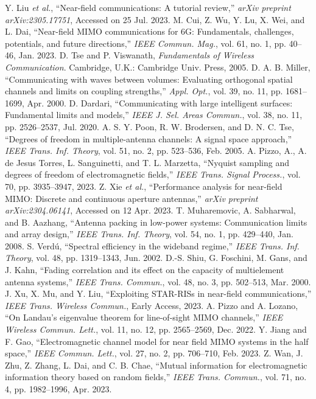 \documentclass[journal]{IEEEtran}
\theoremstyle{definition}
\begin{document}
\begin{thebibliography}{00}
 Y. Liu \emph{et al.}, ``Near-field communications: A tutorial review,'' \emph{arXiv preprint arXiv:2305.17751}, Accessed on 25 Jul. 2023.
 M. Cui, Z. Wu, Y. Lu, X. Wei, and L. Dai, ``Near-field MIMO communications for 6G: Fundamentals, challenges, potentials, and future directions,'' \emph{IEEE Commun. Mag.}, vol. 61, no. 1, pp. 40--46, Jan. 2023.
 D. Tse and P. Viswanath, \emph{Fundamentals of Wireless Communication}. Cambridge, U.K.: Cambridge Univ. Press, 2005.
 D. A. B. Miller, ``Communicating with waves between volumes: Evaluating orthogonal spatial channels and limits on coupling strengths,'' \emph{Appl. Opt.}, vol. 39, no. 11, pp. 1681--1699, Apr. 2000.
 D. Dardari, ``Communicating with large intelligent surfaces: Fundamental limits and models,'' \emph{IEEE J. Sel. Areas Commun.}, vol. 38, no. 11, pp. 2526--2537, Jul. 2020.
 A. S. Y. Poon, R. W. Brodersen, and D. N. C. Tse, ``Degrees of freedom in multiple-antenna channels: A signal space approach,'' \emph{IEEE Trans. Inf. Theory}, vol. 51, no. 2, pp. 523--536, Feb. 2005.
 A. Pizzo, A., A. de Jesus Torres, L. Sanguinetti, and T. L. Marzetta, ``Nyquist sampling and degrees of freedom of electromagnetic fields,'' \emph{IEEE Trans. Signal Process.}, vol. 70, pp. 3935--3947, 2023.
 Z. Xie \emph{et al.}, ``Performance analysis for near-field MIMO: Discrete and continuous aperture antennas,'' \emph{arXiv preprint arXiv:2304.06141}, Accessed on 12 Apr. 2023.
 T. Muharemovic, A. Sabharwal, and B. Aazhang, ``Antenna packing in low-power systems: Communication limits and array design,'' \emph{IEEE Trans. Inf. Theory}, vol. 54, no. 1, pp. 429--440, Jan. 2008.
 S. Verd\'{u}, ``Spectral efficiency in the wideband regime,'' \emph{IEEE Trans. Inf. Theory}, vol. 48, pp. 1319--1343, Jun. 2002.
 D.-S. Shiu, G. Foschini, M. Gans, and J. Kahn, ``Fading correlation and its effect on the capacity of multielement antenna systems,'' \emph{IEEE Trans. Commun.}, vol. 48, no. 3, pp. 502--513, Mar. 2000.
 J. Xu, X. Mu, and Y. Liu, ``Exploiting STAR-RISs in near-field communications,'' \emph{IEEE Trans. Wireless Commun.}, Early Access, 2023.
 A. Pizzo and A. Lozano, ``On Landau's eigenvalue theorem for line-of-sight MIMO channels,'' \emph{IEEE Wireless Commun. Lett.}, vol. 11, no. 12, pp. 2565--2569, Dec. 2022.
 Y. Jiang and F. Gao, ``Electromagnetic channel model for near field MIMO systems in the half space,'' \emph{IEEE Commun. Lett.}, vol. 27, no. 2, pp. 706--710, Feb. 2023.
 Z. Wan, J. Zhu, Z. Zhang, L. Dai, and C. B. Chae, ``Mutual information for electromagnetic information theory based on random fields,'' \emph{IEEE Trans. Commun.}, vol. 71, no. 4, pp. 1982--1996, Apr. 2023.
\end{thebibliography}
\end{document}
